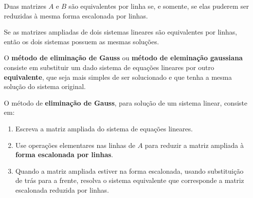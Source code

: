 \documentclass{beamer}
\begin{document}
    \begin{frame}
        \begin{teorema}
            Duas matrizes $A$ e $B$ são equivalentes por linha se, e somente, se elas puderem ser reduzidas à mesma forma escalonada por linhas.
        \end{teorema}
    \end{frame}

    \begin{frame}
        \begin{teorema}
            Se as matrizes ampliadas \pause de dois sistemas lineares são equivalentes por linhas, \pause então os dois sistemas possuem as mesmas soluções.
        \end{teorema}
    \end{frame}

    \begin{frame}
        O \textbf{método de eliminação de Gauss} \pause ou \textbf{método de eleminação gaussiana} \pause consiste em substituir um dado sistema de equações lineares \pause por outro \textbf{equivalente}, que seja mais simples de ser solucionado \pause e que tenha a mesma solução do sistema original.\pause

        \begin{definicao}
            O método de \textbf{eliminação de Gauss}, \pause para solução de um sistema linear, \pause consiste em:\pause
            \begin{enumerate}[label={\roman*})]
                \item Escreva a matriz ampliada do sistema de equações lineares.\pause

                \item Use operações elementares nas linhas de $A$ para reduzir a matriz ampliada à \textbf{forma escalonada por linhas}.\pause

                \item Quando a matriz ampliada estiver na forma escalonada, usando substituição de trás para a frente, \pause resolva o sistema equivalente que corresponde a matriz escalonada reduzida por linhas.
            \end{enumerate}
        \end{definicao}
    \end{frame}
\end{document}
